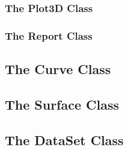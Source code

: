 \subsubsection[Plot3D]{The Plot3D Class}


\subsubsection[Report]{The Report Class}


\subsection[Curve]{The Curve Class}


\subsection[Surface]{The Surface Class}


\subsection[DataSet]{The DataSet Class}


